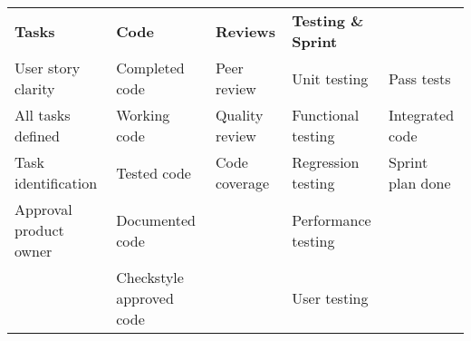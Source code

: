 \begin{tabular}{lllll}
	\textbf{Tasks} & \textbf{Code} & \textbf{Reviews} & \textbf{Testing \& Sprint} \\
	User story clarity & Completed code & Peer review & Unit testing & Pass tests \\
	All tasks defined & Working code & Quality review & Functional testing & Integrated code \\
	Task identification & Tested code & Code coverage & Regression testing & Sprint plan done \\
	Approval product owner & Documented code &  & Performance testing & \\
	& Checkstyle approved code &  & User testing & \\
\end{tabular}